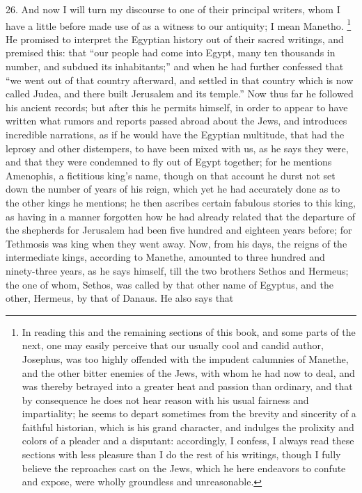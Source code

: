 26. And now I will turn my discourse to one of their principal writers,
whom I have a little before made use of as a witness to our antiquity; I
mean Manetho. \footnote{In reading this and the
remaining sections of this book, and some parts of the next, one may
easily perceive that our usually cool and candid author, Josephus, was too
highly offended with the impudent calumnies of Manethe, and the other
bitter enemies of the Jews, with whom he had now to deal, and was thereby
betrayed into a greater heat and passion than ordinary, and that by
consequence he does not hear reason with his usual fairness and
impartiality; he seems to depart sometimes from the brevity and sincerity
of a faithful historian, which is his grand character, and indulges the
prolixity and colors of a pleader and a disputant: accordingly, I confess,
I always read these sections with less pleasure than I do the rest of his
writings, though I fully believe the reproaches cast on the Jews, which he
here endeavors to confute and expose, were wholly groundless and
unreasonable.} He promised to interpret the
Egyptian history out of their sacred writings, and premised this: that
``our people had come into Egypt, many ten thousands in number, and subdued
its inhabitants;'' and when he had further confessed that ``we went out of
that country afterward, and settled in that country which is now called
Judea, and there built Jerusalem and its temple.'' Now thus far he followed
his ancient records; but after this he permits himself, in order to appear
to have written what rumors and reports passed abroad about the Jews, and
introduces incredible narrations, as if he would have the Egyptian
multitude, that had the leprosy and other distempers, to have been mixed
with us, as he says they were, and that they were condemned to fly out of
Egypt together; for he mentions Amenophis, a fictitious king's name,
though on that account he durst not set down the number of years of his
reign, which yet he had accurately done as to the other kings he mentions;
he then ascribes certain fabulous stories to this king, as having in a
manner forgotten how he had already related that the departure of the
shepherds for Jerusalem had been five hundred and eighteen years before;
for Tethmosis was king when they went away. Now, from his days, the reigns
of the intermediate kings, according to Manethe, amounted to three hundred
and ninety-three years, as he says himself, till the two brothers Sethos
and Hermeus; the one of whom, Sethos, was called by that other name of
Egyptus, and the other, Hermeus, by that of Danaus. He also says that
